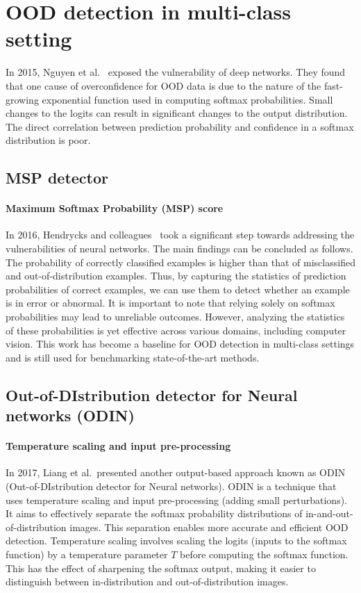 \section{OOD detection in multi-class setting}
In 2015, Nguyen et al.~\cite{nguyenDeepNeuralNetworks2015} exposed the vulnerability of deep networks.
They found that one cause of overconfidence for OOD data is due to the nature of the fast-growing exponential function used in computing softmax probabilities.
Small changes to the logits can result in significant changes to the output distribution. The direct correlation between prediction probability and confidence in a softmax distribution is poor.

\subsection{MSP detector}
\paragraph{Maximum Softmax Probability (MSP) score}
In 2016, Hendrycks and colleagues~\cite{Hendrycks2016} took a significant step towards addressing the vulnerabilities of neural networks. The main findings can be concluded as follows. 
The probability of correctly classified examples is higher than that of misclassified and out-of-distribution examples. 
Thus, by capturing the statistics of prediction probabilities of correct examples, we can use them to detect whether an example is in error or abnormal. 
It is important to note that relying solely on softmax probabilities may lead to unreliable outcomes. 
However, analyzing the statistics of these probabilities is yet effective across various domains, including computer vision. 
This work has become a baseline for OOD detection in multi-class settings and is still used for benchmarking state-of-the-art methods.

\subsection{Out-of-DIstribution detector for Neural networks (ODIN)}
\paragraph{Temperature scaling and input pre-processing}
In 2017, Liang et al.~presented another output-based approach known as ODIN~\cite{Liang2017} 
(Out-of-DIstribution detector for Neural networks). 
ODIN is a technique that uses temperature scaling and input pre-processing (adding small perturbations). 
It aims to effectively separate the softmax probability distributions of in-and-out-of-distribution images. 
This separation enables more accurate and efficient OOD detection.
Temperature scaling involves scaling the logits (inputs to the softmax function) by a temperature parameter $T$ before computing the softmax function. 
This has the effect of sharpening the softmax output, making it easier to distinguish between in-distribution and out-of-distribution images.

